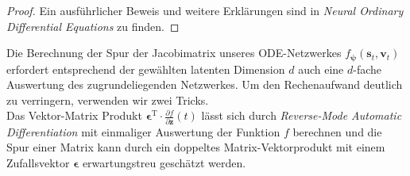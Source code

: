 \documentclass[12pt]{article}
\begin{document}
	\begin{proof}
		Ein ausführlicher Beweis und weitere Erklärungen sind  in \emph{Neural Ordinary Differential Equations} \cite{neuralode} zu finden.
	\end{proof}
	Die Berechnung der Spur der Jacobimatrix unseres ODE-Netzwerkes $f_{\boldsymbol\psi}(\mathbf{s}_{t},\mathbf{v}_{t})$ erfordert entsprechend der gewählten latenten Dimension $d$ auch eine $d$-fache Auswertung des zugrundeliegenden Netzwerkes. Um den Rechenaufwand deutlich zu verringern, verwenden wir zwei Tricks.\cite{ffjord}\\
	Das Vektor-Matrix Produkt $\boldsymbol\epsilon^\mathrm{T} \cdot \tfrac{\partial f}{\partial\mathbf{z}}(t)$ lässt sich durch \emph{Reverse-Mode Automatic Differentiation} mit einmaliger Auswertung der Funktion $f$ berechnen und die Spur einer Matrix kann durch ein doppeltes Matrix-Vektorprodukt mit einem Zufallsvektor $\boldsymbol\epsilon$ erwartungstreu geschätzt werden.
\end{document}
